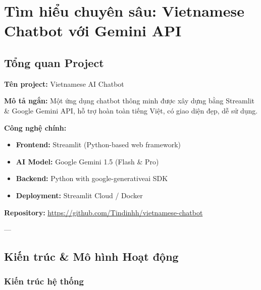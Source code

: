 \documentclass[12pt,a4paper]{article}
\begin{document}

\section{Tìm hiểu chuyên sâu: Vietnamese Chatbot với Gemini API}

\subsection{Tổng quan Project}

\textbf{Tên project:} Vietnamese AI Chatbot

\textbf{Mô tả ngắn:} Một ứng dụng chatbot thông minh được xây dựng bằng Streamlit \& Google Gemini API, hỗ trợ hoàn toàn tiếng Việt, có giao diện đẹp, dễ sử dụng.

\textbf{Công nghệ chính:}
\begin{itemize}
    \item \textbf{Frontend:} Streamlit (Python-based web framework)
    \item \textbf{AI Model:} Google Gemini 1.5 (Flash \& Pro)
    \item \textbf{Backend:} Python with google-generativeai SDK
    \item \textbf{Deployment:} Streamlit Cloud / Docker
\end{itemize}

\textbf{Repository:} \url{https://github.com/Tindinhh/vietnamese-chatbot}

---

\subsection{Kiến trúc \& Mô hình Hoạt động}

\subsubsection{Kiến trúc hệ thống}

\begin{center}
\end{center}
\end{document}
